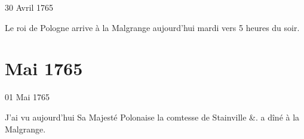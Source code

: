                      \begin{diary}{30 Avril 1765}{}
                        
                        
                           Le roi de Pologne arrive à la
                              Malgrange aujourd'hui
                           mardi vers 5 heures du soir. \bigskip
        
        
                     \end{diary}
                  \chapter*{Mai 1765}
                     
                     

                     \begin{diary}{01 Mai 1765}{}
                        
                         J'ai vu aujourd'hui Sa Majesté Polonaise
                           la comtesse
                              de Stainville &. a dîné à la Malgrange. \bigskip
        
        
                     \end{diary}

